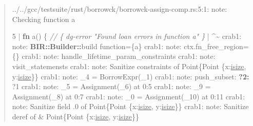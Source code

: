 \documentclass[
  11pt,
  twoside]{report}
\newenvironment{Shaded}{}{}
\newcommand{\CharTok}[1]{#1}
\newcommand{\CommentTok}[1]{\textit{#1}}
\newcommand{\DataTypeTok}[1]{\underline{#1}}
\newcommand{\DecValTok}[1]{#1}
\newcommand{\ErrorTok}[1]{\textbf{#1}}
\newcommand{\KeywordTok}[1]{\textbf{#1}}
\newcommand{\NormalTok}[1]{#1}
\newcommand{\OperatorTok}[1]{#1}
\newcommand{\PreprocessorTok}[1]{\textbf{#1}}
\begin{document}
\begin{quote}
\begin{Shaded}
\begin{Highlighting}[]
\OperatorTok{../../}\NormalTok{gcc}\OperatorTok{/}\NormalTok{testsuite}\OperatorTok{/}\NormalTok{rust}\OperatorTok{/}\NormalTok{borrowck}\OperatorTok{/}\NormalTok{borrowck}\OperatorTok{{-}}\NormalTok{assign}\OperatorTok{{-}}\NormalTok{comp}\OperatorTok{.}\NormalTok{rs}\OperatorTok{:}\DecValTok{5}\OperatorTok{:}\DecValTok{1}\OperatorTok{:}\NormalTok{ note}\OperatorTok{:} 
\NormalTok{ Checking function a}

    \DecValTok{5} \OperatorTok{|} \KeywordTok{fn}\NormalTok{ a() }\OperatorTok{\{} \CommentTok{// \{ dg{-}error "Found loan errors in function a" \}}
      \OperatorTok{|} \OperatorTok{\^{}\textasciitilde{}}
\NormalTok{crab1}\OperatorTok{:}\NormalTok{ note}\OperatorTok{:} \PreprocessorTok{BIR::Builder::}\NormalTok{build function}\OperatorTok{=\{}\NormalTok{a}\OperatorTok{\}}
\NormalTok{crab1}\OperatorTok{:}\NormalTok{ note}\OperatorTok{:}\NormalTok{  ctx}\OperatorTok{.}\NormalTok{fn\_free\_region}\OperatorTok{=\{\}}
\NormalTok{crab1}\OperatorTok{:}\NormalTok{ note}\OperatorTok{:}\NormalTok{  handle\_lifetime\_param\_constraints}
\NormalTok{crab1}\OperatorTok{:}\NormalTok{ note}\OperatorTok{:}\NormalTok{ visit\_statemensts}
\NormalTok{crab1}\OperatorTok{:}\NormalTok{ note}\OperatorTok{:}\NormalTok{  Sanitize constraints of Point}\OperatorTok{\{}\NormalTok{Point }\OperatorTok{\{}\NormalTok{x}\OperatorTok{:}\DataTypeTok{isize}\OperatorTok{,}\NormalTok{ y}\OperatorTok{:}\DataTypeTok{isize}\OperatorTok{\}\}}
\NormalTok{crab1}\OperatorTok{:}\NormalTok{ note}\OperatorTok{:}\NormalTok{  \_4 }\OperatorTok{=}\NormalTok{ BorrowExpr(\_1)}
\NormalTok{crab1}\OperatorTok{:}\NormalTok{ note}\OperatorTok{:}\NormalTok{      push\_subset}\OperatorTok{:} \CharTok{\textquotesingle{}}\ErrorTok{?2: }\CharTok{\textquotesingle{}}\OperatorTok{?}\DecValTok{1}
\NormalTok{crab1}\OperatorTok{:}\NormalTok{ note}\OperatorTok{:}\NormalTok{  \_5 }\OperatorTok{=}\NormalTok{ Assignment(\_6) at }\DecValTok{0}\OperatorTok{:}\DecValTok{5}
\NormalTok{crab1}\OperatorTok{:}\NormalTok{ note}\OperatorTok{:}\NormalTok{  \_9 }\OperatorTok{=}\NormalTok{ Assignment(\_8) at }\DecValTok{0}\OperatorTok{:}\DecValTok{7}
\NormalTok{crab1}\OperatorTok{:}\NormalTok{ note}\OperatorTok{:}\NormalTok{  \_0 }\OperatorTok{=}\NormalTok{ Assignment(\_10) at }\DecValTok{0}\OperatorTok{:}\DecValTok{11}
\NormalTok{crab1}\OperatorTok{:}\NormalTok{ note}\OperatorTok{:}\NormalTok{  Sanitize field }\OperatorTok{.}\DecValTok{0}\NormalTok{ of Point}\OperatorTok{\{}\NormalTok{Point }\OperatorTok{\{}\NormalTok{x}\OperatorTok{:}\DataTypeTok{isize}\OperatorTok{,}\NormalTok{ y}\OperatorTok{:}\DataTypeTok{isize}\OperatorTok{\}\}}
\NormalTok{crab1}\OperatorTok{:}\NormalTok{ note}\OperatorTok{:}\NormalTok{  Sanitize deref of }\OperatorTok{\&}\NormalTok{ Point}\OperatorTok{\{}\NormalTok{Point }\OperatorTok{\{}\NormalTok{x}\OperatorTok{:}\DataTypeTok{isize}\OperatorTok{,}\NormalTok{ y}\OperatorTok{:}\DataTypeTok{isize}\OperatorTok{\}\}}
\end{Highlighting}
\end{Shaded}
\end{quote}
\end{document}
